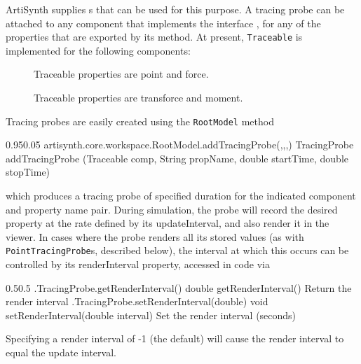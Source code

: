 ArtiSynth supplies s that can be used for this
purpose.  A tracing probe can be attached to any component that implements the
interface
, for any of the properties that
are exported by its 
 method.
At present, {\tt Traceable} is implemented for the following components:

\begin{description}

\item[]\mbox{}

Traceable properties are {\sf point} and {\sf force}.

\item[]\mbox{}

Traceable properties are {\sf transforce} and {\sf moment}.

\end{description}


Tracing probes are easily created using the {\tt RootModel} method
%
\begin{methodtable}{0.95}{0.05}
%
\methodentry
{artisynth.core.workspace.RootModel.addTracingProbe(,,,)}%
{TracingProbe addTracingProbe (Traceable comp, String propName,
double startTime, double stopTime)}%
{\ }%
%
\end{methodtable}
%
which produces a tracing probe of specified duration for the indicated
component and property name pair. During simulation, the probe will record the
desired property at the rate defined by its {\sf updateInterval}, and also
render it in the viewer. In cases where the probe renders all its stored values
(as with {\tt PointTracingProbe}s, described below), the interval at which this
occurs can be controlled by its {\sf renderInterval} property, accessed
in code via
%
\begin{methodtable}{0.5}{0.5}
%
\methodentry
{\probes.TracingProbe.getRenderInterval()}%
{double getRenderInterval()}%
{Return the render interval}%
%
\methodentry
{\probes.TracingProbe.setRenderInterval(double)}%
{void setRenderInterval(double interval)}%
{Set the render interval (seconds)}%
%
\end{methodtable}
%
Specifying a render interval of -1 (the default) will cause
the render interval to equal the update interval.

